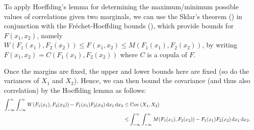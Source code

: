 \begin{enumerate}
\begin{note}
To apply Hoeffding's lemma for determining the maximum/minimum possible values
of correlations given two marginals, we can use the Sklar's theorem
() in conjunction with the Fr\'echet-Hoeffding bounds
(), which provide bounds for \(F(x_1,x_2)\),
namely \(W(F_1(x_1),F_2(x_2))\le F(x_1,x_2)\le M(F_1(x_1),F_2(x_2))\),
by writing \(F(x_1,x_2)=C(F_1(x_1),F_2(x_2))\) where \(C\) is a copula of
\(F\). 

Once the margins are fixed, the upper and lower bounds here are fixed (so do
the variances of \(X_1\) and \(X_2\)). Hence, we can then bound the covariance
(and thus also correlation) by the Hoeffding lemma as follows:
\begin{align*}
\int_{-\infty}^{\infty}\int_{-\infty}^{\infty}
W(F_1(x_1),F_2(x_2))-F_1(x_1)F_2(x_2)\odif{x_1}\odif{x_2}
&\le\cov{X_1,X_2} \\
&\le
\int_{-\infty}^{\infty}\int_{-\infty}^{\infty}
M(F_1(x_1),F_2(x_2))-F_1(x_1)F_2(x_2)\odif{x_1}\odif{x_2}.
\end{align*}
\end{note}
\end{enumerate}
